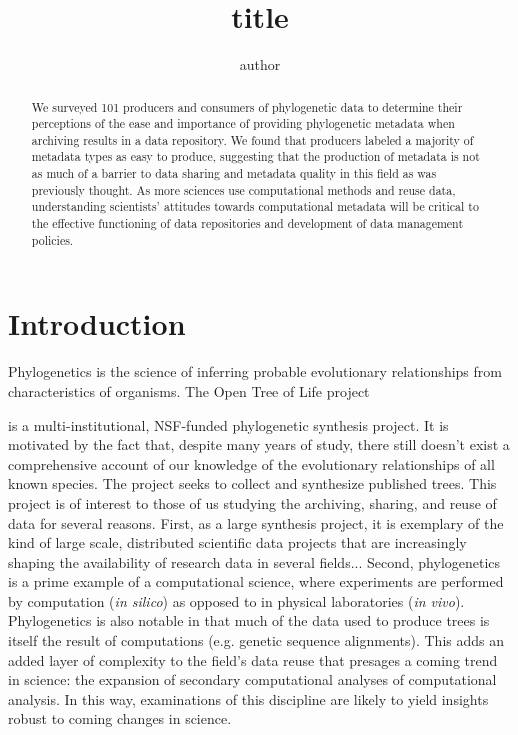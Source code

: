 \documentclass[12pt]{scrartcl}
\title{title}
\author{author}
\begin{document}
%
%

\maketitle
\thispagestyle{fancy}



\begin{abstract}
We surveyed 101 producers and consumers of phylogenetic data to determine their perceptions of the ease and importance of providing phylogenetic metadata when archiving results in a data repository.  We found that producers labeled a majority of metadata types as easy to produce, suggesting that the production of metadata is not as much of a barrier to data sharing and metadata quality in this field as was previously thought.  
As more sciences use computational methods and reuse data, understanding scientists' attitudes towards computational metadata will be critical to the effective functioning of data repositories and development of data management policies.
\end{abstract}


\section{Introduction}
Phylogenetics is the science of inferring probable evolutionary relationships from characteristics of organisms.  
The Open Tree of Life project %

is a multi-institutional, NSF-funded phylogenetic synthesis project.  It is motivated by the fact that, despite many years of study, there still doesn't exist a comprehensive account of our knowledge of the evolutionary relationships of all known species.  The project seeks to collect and synthesize published trees.
This project is of interest to those of us studying the archiving, sharing, and reuse of data for several reasons.  First, as a large synthesis project, it is exemplary of the kind of large scale, distributed scientific data projects that are increasingly shaping the availability of research data in several fields... %
Second, phylogenetics is a prime example of a computational science, where experiments are performed by computation (\textit{in silico}) as opposed to in physical laboratories (\textit{in vivo}).  Phylogenetics is also notable in that much of the data used to produce trees is itself the result of computations (e.g. genetic sequence alignments).  This adds an added layer of complexity to the field's data reuse that presages a coming trend in science: the expansion of secondary computational analyses of computational analysis.  In this way, examinations of this discipline are likely to yield insights robust to coming changes in science.
\end{document}

